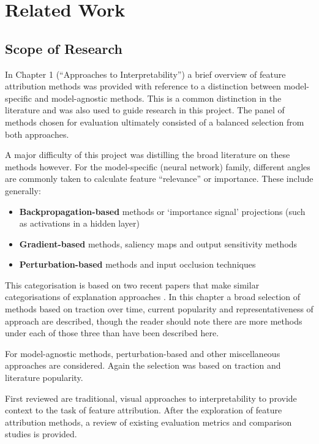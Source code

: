 \documentclass[main]{subfiles}
\begin{document}
\chapter{Related Work}

\section{Scope of Research} \label{sec:scoperesearch}

In Chapter 1 (``Approaches to Interpretability'') a brief overview of feature attribution methods was provided with reference to a distinction between model-specific and model-agnostic methods. This is a common distinction in the literature and was also used to guide research in this project. The panel of methods chosen for evaluation ultimately consisted of a balanced selection from both approaches. 

A major difficulty of this project was distilling the broad literature on these methods however. For the model-specific (neural network) family, different angles are commonly taken to calculate feature ``relevance'' or importance. These include generally:
\begin{itemize}
\item \textbf{Backpropagation-based} methods or `importance signal' projections (such as activations in a hidden layer)
\item \textbf{Gradient-based} methods, saliency maps and output sensitivity methods
\item \textbf{Perturbation-based} methods and input occlusion techniques
\end{itemize}

This categorisation is based on two recent papers that make similar categorisations of explanation approaches  \cite{deeplift} \cite{patternnet}. In this chapter a broad selection of methods based on traction over time, current popularity and representativeness of approach are described, though the reader should note there are more methods under each of those three than have been described here.

For model-agnostic methods, perturbation-based and other miscellaneous approaches are considered. Again the selection was based on traction and literature popularity.

First reviewed are traditional, visual approaches to interpretability to provide context to the task of feature attribution. After the exploration of feature attribution methods, a review of existing evaluation metrics and comparison studies is provided.
\end{document}

